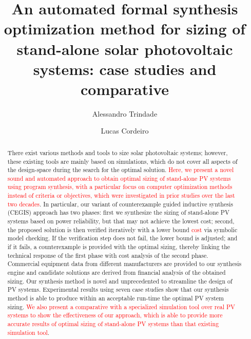 \documentclass[review]{elsarticle}
\begin{document}
\begin{frontmatter}

\title{An automated formal synthesis optimization method for sizing of stand-alone solar photovoltaic systems: case studies and comparative}
%
%
\author[mymainaddress]{Alessandro Trindade}

\author[mysecondaryaddress]{Lucas Cordeiro}


\address[mymainaddress]{Federal University of Amazonas, Av. Rodrigo Octávio, 6200, Coroado I, 69077-000 Manaus-AM-Brazil}
\address[mysecondaryaddress]{University of Manchester, School of Computer Science, Kilburn Building, Manchester M13 9PL}

\begin{abstract}
There exist various methods and tools to size solar photovoltaic systems; however, these existing tools are mainly based on simulations, which do not cover all aspects of the design-space during the search for the optimal solution. \textcolor{red}{Here, we present a novel sound and automated approach to obtain optimal sizing of stand-alone PV systems using program synthesis, with a particular focus on computer optimization methods instead of criteria or objectives, which were investigated in prior studies over the last two decades}. In particular, our variant of counterexample guided inductive synthesis (CEGIS) approach has two phases: first we synthesize the sizing of stand-alone PV systems based on power reliability, but that may not achieve the lowest cost; second, the proposed solution is then verified iteratively with a lower bound \textcolor{red}{cost} via symbolic model checking. If the verification step does not fail, the lower bound is adjusted; and if it fails, a counterexample is provided with the optimal sizing, thereby linking the technical response of the first phase with cost analysis of the second phase. Commercial equipment data from different manufacturers are provided to our synthesis engine and candidate solutions are derived from financial analysis of the obtained sizing. Our synthesis method is novel and unprecedented to streamline the design of PV systems. Experimental results using seven case studies show that our synthesis method is able to produce within an acceptable run-time the optimal PV system sizing. \textcolor{red}{We also present a comparative with a specialized simulation tool over real PV systems to show the effectiveness of our approach, which is able to provide more accurate results of optimal sizing of stand-alone PV systems than that existing simulation tool}.
\end{abstract}


\end{frontmatter}
\end{document}
